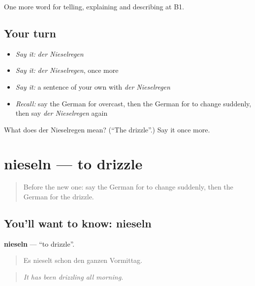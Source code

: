 \begin{grammarlens}[title={What you've built}]
One more word for telling, explaining and describing at B1.
\end{grammarlens}

\subsection*{Your turn}
\begin{itemize}
\raggedright
  \item \emph{Say it:} \emph{der Nieselregen}
  \item \emph{Say it:} \emph{der Nieselregen}, once more
  \item \emph{Say it:} a sentence of your own with \emph{der Nieselregen}
  \item \emph{Recall:} say the German for overcast, then the German for to change suddenly, then say \emph{der Nieselregen} again
\end{itemize}

\begin{tcolorbox}[breakable,colback=teal!4,colframe=teal!35!black,title={Before you move on}]
What does der Nieselregen mean? (\textquotedblleft{}The drizzle\textquotedblright{}.) Say it once more.
\end{tcolorbox}
\section[nieseln]{nieseln — to drizzle}

\label{lesson:GE-C461-nieseln}



\begin{quote}
Before the new one: say the German for to change suddenly, then the German for the drizzle.
\end{quote}

\subsection*{You'll want to know: nieseln}
\textbf{nieseln} — \textquotedblleft{}to drizzle\textquotedblright{}.

\begin{quote}
Es nieselt schon den ganzen Vormittag.
\end{quote}

\begin{quote}
\emph{It has been drizzling all morning.}
\end{quote}

